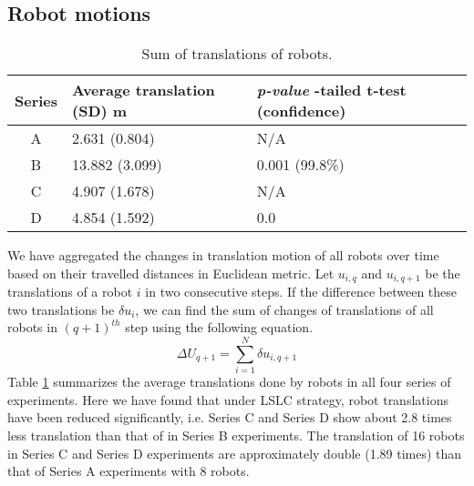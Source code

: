 \documentclass[journal]{IEEEtran}
\begin{document}
\subsection{Robot motions}
\vspace*{-0.3cm}
\begin{table}[h!]
\begin{small}
\begin{center}
\caption{Sum of translations of robots.}
\begin{tabular}{|c|p{0.8in}|p{0.8in}|}
\hline Series & Average \protect\newline translation \protect\newline(SD) m & \textit{p-value} \protect\newline 1-tailed \protect\newline t-test \protect\newline (confidence)\\ 
\hline A & 2.631 (0.804) & N/A\\ 
\hline B & 13.882 (3.099) & 0.001 (99.8\%)\\
\hline C & 4.907 (1.678) & N/A\\
\hline D  & 4.854  (1.592) & 0.0\\
\hline
\end{tabular}
\label{table:motion-cmp} 
\end{center}
\end{small}
\vspace*{-0.3cm}
\end{table}
We have aggregated the changes in translation motion of all robots over time based on their travelled distances in Euclidean metric. Let $u_{i,q}$ and $u_{i,q+1}$ be the translations of a robot $i$ in two consecutive steps. If the difference between these two translations be $\delta u_{i}$, we can find the sum of changes of translations of all robots in $(q+1)^{th}$ step using the following equation.
\begin{equation}
\Delta U_{q+1} = \sum_{i=1}^{N} \delta u_{i, q+1} 
\label{eqn:Delta-Tr}
\end{equation}
Table \ref{table:motion-cmp} summarizes the average translations done by robots in all four series of experiments. Here we have found that under LSLC strategy, robot translations have been reduced significantly, i.e. Series C and Series D show about 2.8 times less translation than that of in Series B experiments. The translation of 16 robots in Series C and Series D experiments are approximately double (1.89 times) than that of Series A experiments with 8 robots.
\vspace*{-0.2cm}
\end{document}
